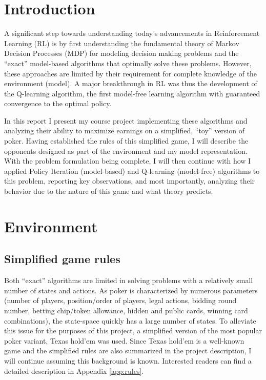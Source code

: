 \section{Introduction}

A significant step towards understanding today's advancements in Reinforcement Learning (RL) is by first understanding the fundamental theory of Markov Decision Processes (MDP) for modeling decision making problems and the ``exact'' model-based algorithms that optimally solve these problems. However, these approaches are limited by their requirement for complete knowledge of the environment (model). A major breakthrough in RL was thus the development of the Q-learning algorithm, the first model-free learning algorithm with guaranteed convergence to the optimal policy.

In this report I present my course project implementing these algorithms and analyzing their ability to maximize earnings on a simplified, ``toy'' version of poker. Having established the rules of this simplified game, I will describe the opponents designed as part of the environment and my model representation. With the problem formulation being complete, I will then continue with how I applied Policy Iteration (model-based) and Q-learning (model-free) algorithms to this problem, reporting key observations, and most importantly, analyzing their behavior due to the nature of this game and what theory predicts.

\section{Environment}

\subsection{Simplified game rules}

Both ``exact'' algorithms are limited in solving problems with a relatively small number of states and actions. As poker is characterized by numerous parameters (number of players, position/order of players, legal actions, bidding round number, betting chip/token allowance, hidden and public cards, winning card combinations), the state-space quickly has a large number of states. To alleviate this issue for the purposes of this project, a simplified version of the most popular poker variant, Texas hold'em was used. Since Texas hold'em is a well-known game and the simplified rules are also summarized in the project description, I will continue assuming this background is known. Interested readers can find a detailed description in Appendix \ref{app:rules}.

